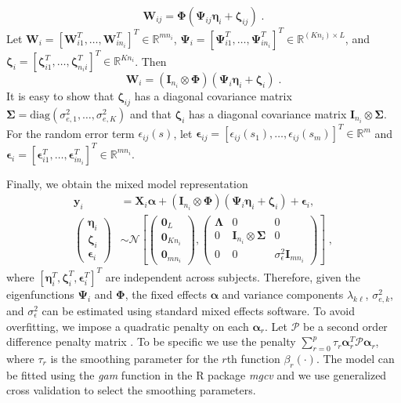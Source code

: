 \documentclass[submit]{smj}
\def\by{\mathbf{y}}
\def\balpha{\boldsymbol{\alpha}}
\def\bX{\mathbf{X}}
\def\bSigma{\boldsymbol{\Sigma}}
\def\bI{\mathbf{I}}
\def\bP{\mathbf{P}}
\def\bX{\mathbf{X}}
\def\by{\mathbf{y}}
\def\balpha{\boldsymbol{\alpha}}
\def\bX{\mathbf{X}}
\def\bSigma{\boldsymbol{\Sigma}}
\def\bI{\mathbf{I}}
\def\bP{\mathbf{P}}
\def\bP{\mathbf{\mathcal{P}}}
\def\bPsi{\boldsymbol{\Psi}}
\def\bPhi{\boldsymbol{\Phi}}
\def\bepsilon{\boldsymbol{\epsilon}}
\def\bLambda{\boldsymbol{\Lambda}}
\def\bzeta{\boldsymbol{\zeta}}
\def\beeta{\boldsymbol{\eta}}
\begin{document}
\begin{equation*}
\boldsymbol{W}_{ij} = \bPhi\left(\bPsi_{ij}\beeta_{i} + \bzeta_{ij}\right)\;.
\end{equation*}
Let $\boldsymbol{W}_i = [\boldsymbol{W}_{i1}^{T},\ldots, \boldsymbol{W}_{in_i}^{T}]^{T}\in
\mathbb{R}^{mn_i}$, $\bPsi_i =[\bPsi^{T}_{i1},\ldots, \bPsi^{T}_{in_i}]^{T} \in \mathbb{R}^{(Kn_i) \times L }$, and $\bzeta_i = [\bzeta^{T}_{i1},\ldots, \bzeta^{T}_{n_ii}]^{T} \in \mathbb{R}^{Kn_i}$. Then
\begin{equation*}
\boldsymbol{W}_i = (\mathbf{I}_{n_i}\otimes \bPhi)\left(
\bPsi_i\beeta_i  + \bzeta_i\right)\;.
\end{equation*}
It is easy to show that $\bzeta_{ij}$ has a diagonal covariance matrix $\bSigma = \text{diag}(\sigma_{e,1}^2,\ldots, \sigma_{e,K}^2)$ and that $\bzeta_i$ has a diagonal covariance matrix $\mathbf{I}_{n_i}\otimes\bSigma$. For the random error term $\epsilon_{ij}(s)$, let $\bepsilon_{ij} = [\epsilon_{ij}(s_1),\ldots, \epsilon_{ij}(s_m)]^{T}\in\mathbb{R}^m$ and $\bepsilon_{i} = [\bepsilon^{T}_{i1},\ldots, \bepsilon^{T}_{in_i}]^{T} \in \mathbb{R}^{mn_i}$. 

Finally, we obtain the mixed model representation
\begin{equation} \label{eq:mixed}
\begin{split}
\by_i &= \bX_i \balpha +  (\mathbf{I}_{n_i}\otimes \bPhi)\left(
\bPsi_i\beeta_i  + \bzeta_i\right) + \bepsilon_i,\\
\begin{pmatrix}\beeta_i\\ \bzeta_i \\\bepsilon_i\end{pmatrix}&\sim \mathcal{N}\left[
\begin{pmatrix} \mathbf{0}_{L}\\\mathbf{0}_{Kn_i}\\\mathbf{0}_{mn_i}\end{pmatrix},
\begin{pmatrix} \bLambda&0&0\\0&\mathbf{I}_{n_i}\otimes\bSigma&0\\ 0&0&\sigma_{\epsilon}^2\bI_{mn_i}\end{pmatrix}
\right]\;,
\end{split}
\end{equation}
where $[\beeta^{T}_i, \bzeta^{T}_i,\bepsilon^{T}_i]^{T}$ are independent across subjects. Therefore, given the eigenfunctions $\bPsi_i$ and $\bPhi$,  the fixed effects $\balpha$ and variance components $\lambda_{k\ell}$, $\sigma_{e,k}^2$, and $\sigma_{\epsilon}^2$ can be estimated using standard mixed effects software. To avoid overfitting, we impose a quadratic penalty on each $\balpha_r$. Let $\bP$ be a second order difference penalty matrix \citep{Eilers1996}. To be specific we use the penalty $\sum_{r=0}^p \tau_r \balpha^{T}_r\bP\balpha_r$, where $\tau_r$ is the smoothing parameter for the $r$th function $\beta_r(\cdot)$. The model can be fitted using the {\it gam} function \citep{Wood2016} in the R package {\it mgcv} \citep{mgcv2019} and we use generalized cross validation to select the smoothing parameters.
\end{document}
